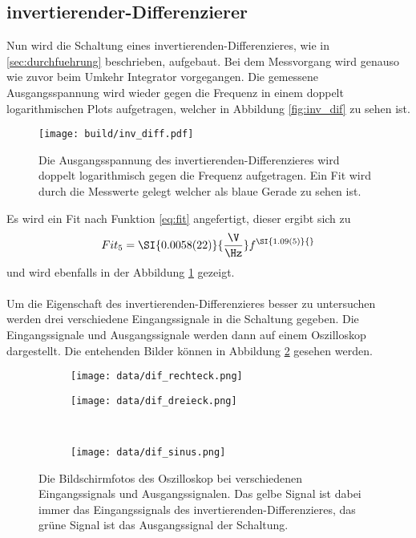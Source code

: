 \subsection{invertierender-Differenzierer}
Nun wird die Schaltung eines invertierenden-Differenzieres, wie in \ref{sec:durchfuehrung} beschrieben, aufgebaut.
Bei dem Messvorgang wird genauso wie zuvor beim Umkehr Integrator vorgegangen.
Die gemessene Ausgangsspannung wird wieder gegen die Frequenz in einem doppelt logarithmischen Plots aufgetragen, welcher in Abbildung \ref{fig:inv_dif} zu sehen ist.
\begin{figure}
    \centering
    \texttt{[image: build/inv\_diff.pdf]}
    \caption{Die Ausgangsspannung des invertierenden-Differenzieres wird doppelt logarithmisch gegen die Frequenz aufgetragen.
    Ein Fit wird durch die Messwerte gelegt welcher als blaue Gerade zu sehen ist.}
    \label{fig:inv_diff}
\end{figure}
Es wird ein Fit nach Funktion \eqref{eq:fit} angefertigt, dieser ergibt sich zu 
\begin{equation*}
    Fit_5 = \SI{0.0058(22)}{\frac{\V}{\Hz}} f^{\SI{1.09(5)}{}}
\end{equation*}
und wird ebenfalls in der Abbildung \ref{fig:inv_diff} gezeigt.\\\\
Um die Eigenschaft des invertierenden-Differenzieres besser zu untersuchen werden drei verschiedene Eingangssignale in die Schaltung gegeben.
Die Eingangssignale und Ausgangssignale werden dann auf einem Oszilloskop dargestellt.
Die entehenden Bilder können in Abbildung \ref{fig:dif_oszi} gesehen werden.
\begin{figure}
    \centering
    \begin{subfigure}{0.49\linewidth}%
        \texttt{[image: data/dif\_rechteck.png]}
    \end{subfigure}
    \hfill
    \begin{subfigure}{0.49\linewidth}%
        \texttt{[image: data/dif\_dreieck.png]}
    \end{subfigure}\\
    \begin{subfigure}{0.49\linewidth}%
        \texttt{[image: data/dif\_sinus.png]}
    \end{subfigure}
    \caption{Die Bildschirmfotos des Oszilloskop bei verschiedenen Eingangssignals und Ausgangssignalen.
    Das gelbe Signal ist dabei immer das Eingangssignals des invertierenden-Differenzieres, das grüne Signal ist das Ausgangssignal der Schaltung.}
    \label{fig:dif_oszi}
\end{figure}